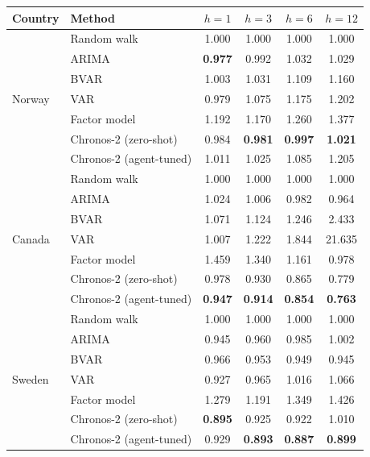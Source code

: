 \begin{tabular}{llcccc}
\toprule
Country & Method & $h{=}1$ & $h{=}3$ & $h{=}6$ & $h{=}12$ \\
\midrule
\multirow{7}{*}{Norway} & Random walk & 1.000 & 1.000 & 1.000 & 1.000 \\
 & ARIMA & \textbf{0.977} & 0.992 & 1.032 & 1.029 \\
 & BVAR & 1.003 & 1.031 & 1.109 & 1.160 \\
 & VAR & 0.979 & 1.075 & 1.175 & 1.202 \\
 & Factor model & 1.192 & 1.170 & 1.260 & 1.377 \\
 & Chronos-2 (zero-shot) & 0.984 & \textbf{0.981} & \textbf{0.997} & \textbf{1.021} \\
 & Chronos-2 (agent-tuned) & 1.011 & 1.025 & 1.085 & 1.205 \\
\midrule
\multirow{7}{*}{Canada} & Random walk & 1.000 & 1.000 & 1.000 & 1.000 \\
 & ARIMA & 1.024 & 1.006 & 0.982 & 0.964 \\
 & BVAR & 1.071 & 1.124 & 1.246 & 2.433 \\
 & VAR & 1.007 & 1.222 & 1.844 & 21.635 \\
 & Factor model & 1.459 & 1.340 & 1.161 & 0.978 \\
 & Chronos-2 (zero-shot) & 0.978 & 0.930 & 0.865 & 0.779 \\
 & Chronos-2 (agent-tuned) & \textbf{0.947} & \textbf{0.914} & \textbf{0.854} & \textbf{0.763} \\
\midrule
\multirow{7}{*}{Sweden} & Random walk & 1.000 & 1.000 & 1.000 & 1.000 \\
 & ARIMA & 0.945 & 0.960 & 0.985 & 1.002 \\
 & BVAR & 0.966 & 0.953 & 0.949 & 0.945 \\
 & VAR & 0.927 & 0.965 & 1.016 & 1.066 \\
 & Factor model & 1.279 & 1.191 & 1.349 & 1.426 \\
 & Chronos-2 (zero-shot) & \textbf{0.895} & 0.925 & 0.922 & 1.010 \\
 & Chronos-2 (agent-tuned) & 0.929 & \textbf{0.893} & \textbf{0.887} & \textbf{0.899} \\
\bottomrule
\end{tabular}

